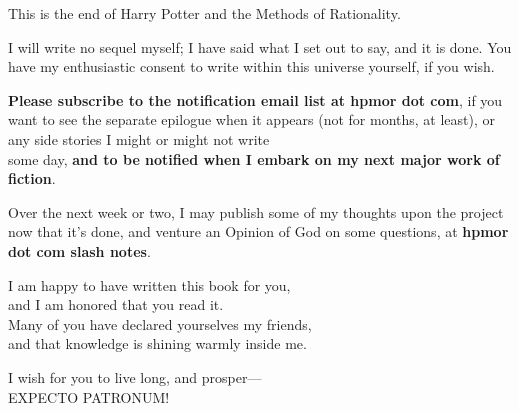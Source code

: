 \cleartoverso
\thispagestyle{empty}
{
\null\SomeVSpace
\itshape
\begin{center}
This is the end of Harry Potter and the Methods of Rationality.

\SomeVSpace
I will write no sequel myself; I have said what I set out to say, and it is
done.  You have my enthusiastic consent to write within this universe
yourself, if you wish.

\SomeVSpace
\textbf{Please subscribe to the notification email list at hpmor dot com}, if you
want to see the separate epilogue when it appears (not for months, at
least), or any side stories I might or might not write\\ some day, \textbf{and to be
notified when I embark on my next major work of fiction}.

\SomeVSpace
Over the next week or two, I may publish some of my thoughts upon the
project now that it's done, and venture an Opinion of God on some
questions, at \textbf{hpmor dot com slash notes}.


\SomeVSpace
I am happy to have written this book for you,\\
and I am honored that you read it.\\
Many of you have declared yourselves my friends,\\
and that knowledge is shining warmly inside me.

\SomeVSpace
I wish for you to live long, and prosper---\\
EXPECTO PATRONUM!
\end{center}
}
